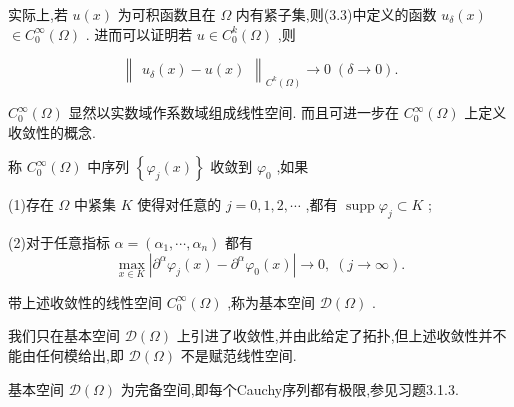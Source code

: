 \documentclass[lang=cn,newtx,10pt,scheme=chinese,thmcnt=chapter]{elegantbook}
\begin{document}
\begin{note}
  实际上,若 \(u\left( x\right)\) 为可积函数且在 \(\Omega\) 内有紧子集,则(3.3)中定义的函数 \({u}_{\delta }\left( x\right)\)  \(\in  {C}_{0}^{\infty }\left( \Omega \right)\) . 进而可以证明若 \(u \in  {C}_{0}^{k}\left( \Omega \right)\) ,则

\begin{equation*}
{\begin{Vmatrix}{u}_{\delta }\left( x\right)  - u\left( x\right) \end{Vmatrix}}_{{C}^{k}\left( \Omega \right) } \rightarrow  0\;\left( {\delta  \rightarrow  0}\right) .
\end{equation*}

\end{note}


 \({C}_{0}^{\infty }\left( \Omega \right)\) 显然以实数域作系数域组成线性空间. 而且可进一步在 \({C}_{0}^{\infty }\left( \Omega \right)\) 上定义收敛性的概念.
\begin{definition}
  称 \({C}_{0}^{\infty }\left( \Omega \right)\) 中序列 \(\left\{  {{\varphi }_{j}\left( x\right) }\right\}\) 收敛到 \({\varphi }_{0}\) ,如果

(1)存在 \(\Omega\) 中紧集 \(K\) 使得对任意的 \(j = 0,1,2,\cdots\) ,都有 \(\operatorname{supp}{\varphi }_{j} \subset  K\) ;

(2)对于任意指标 \(\alpha  = \left( {{\alpha }_{1},\cdots ,{\alpha }_{n}}\right)\) 都有
\begin{equation*}
\mathop{\max }\limits_{{x \in  K}}\left| {{\partial }^{\alpha }{\varphi }_{j}\left( x\right)  - {\partial }^{\alpha }{\varphi }_{0}\left( x\right) }\right|  \rightarrow  0,\;\left( {j \rightarrow  \infty }\right) .
\end{equation*}

带上述收敛性的线性空间 \({C}_{0}^{\infty }\left( \Omega \right)\) ,称为基本空间 \(\mathcal{D}\left( \Omega \right)\) .
\end{definition}
\begin{note}
  我们只在基本空间 \(\mathcal{D}\left( \Omega \right)\) 上引进了收敛性,并由此给定了拓扑,但上述收敛性并不能由任何模给出,即 \(\mathcal{D}\left( \Omega \right)\) 不是赋范线性空间.


\end{note}

\begin{note}
  基本空间 \(\mathcal{D}\left( \Omega \right)\) 为完备空间,即每个Cauchy序列都有极限,参见习题3.1.3.
\end{note}
\end{document}
